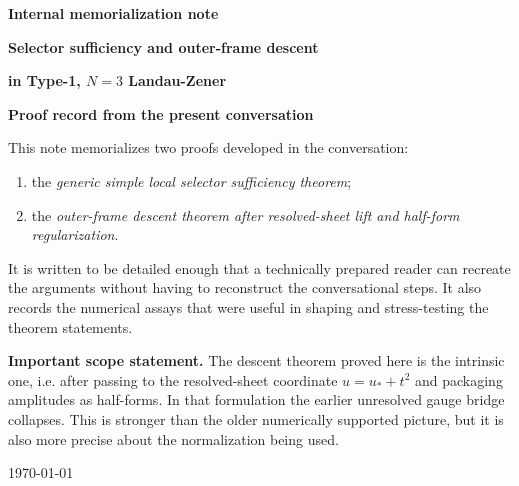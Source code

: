 \documentclass[11pt]{article}
\numberwithin{equation}{section}
\theoremstyle{definition}
\begin{document}
\begin{titlepage}
\thispagestyle{empty}
\centering
\vspace*{1.0cm}

{\Large\color{AccentBlue}\bfseries Internal memorialization note\par}
\vspace{0.7cm}

{\fontsize{24}{28}\selectfont\bfseries\color{TitleBlue}Selector sufficiency and outer-frame descent\par}
\vspace{0.15cm}
{\fontsize{19}{23}\selectfont\bfseries\color{TitleBlue}in Type-1, $N=3$ Landau-Zener\par}
\vspace{0.2cm}
{\Large\color{AccentBlue}\bfseries Proof record from the present conversation\par}

\vspace{1.0cm}

\begin{minipage}{0.9\textwidth}
\small
This note memorializes two proofs developed in the conversation:
\begin{enumerate}
  \item the \emph{generic simple local selector sufficiency theorem};
  \item the \emph{outer-frame descent theorem after resolved-sheet lift and half-form regularization}.
\end{enumerate}
It is written to be detailed enough that a technically prepared reader can recreate the arguments without having to reconstruct the conversational steps. It also records the numerical assays that were useful in shaping and stress-testing the theorem statements.

\medskip
\textbf{Important scope statement.} The descent theorem proved here is the intrinsic one, i.e. after passing to the resolved-sheet coordinate $u=u_*+t^2$ and packaging amplitudes as half-forms. In that formulation the earlier unresolved gauge bridge collapses. This is stronger than the older numerically supported picture, but it is also more precise about the normalization being used.
\end{minipage}

\vfill

{\large\color{MutedText}\today\par}
\end{titlepage}

\tableofcontents
\clearpage
\end{document}
